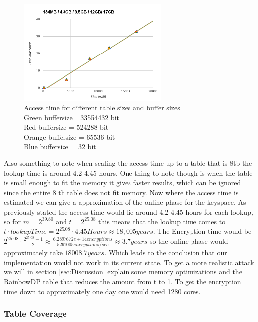 \begin{figure}[H]
  \centering
  \includegraphics[width=0.65\textwidth]{figures/AccessTime.png}
  \caption{Access time for different table sizes and buffer sizes\\
    Green buffersize= 33554432 bit\\
    Red buffersize = 524288 bit\\
    Orange buffersize = 65536 bit\\
    Blue buffersize = 32 bit\\
    }
  \label{fig:tableAccess}
\end{figure}

Also something to note when scaling the access time up to a table that is 8tb the lookup time is around 4.2-4.45 hours.
One thing to note though is when the table is small enough to fit the
memory it gives faster results, which can be ignored since the entire
8 tb table does not fit memory. Now where the access time is estimated
we can give a approximation of the online phase for the 
keyspace. As previously stated the access time would lie around
4.2-4.45 hours for each lookup, so for $m=2^{39.80}$ and $t=2^{25.08}$
this means that the lookup time comes to $t\cdot
lookupTime=2^{25.08}\cdot 4.45 Hours \approx 18,005 years$. The
Encryption time would be $2^{25.08}\cdot\frac{2^{25.08}-1}{2}\approx
\frac{6.2897672e+14 encryptions}{5291005 encryptions/sec} \approx 3.7
years$ so the online phase would approximately take $18008.7
years$. Which leads to the conclusion that our implementation would
not work in its current state. To get a more realistic attack we will
in section \ref{sec:Discussion} explain some memory optimizations and
the RainbowDP table that reduces the amount from t to 1. To get the
encryption time down to approximately one day one would need 1280
cores.

\subsubsection{Table Coverage}


